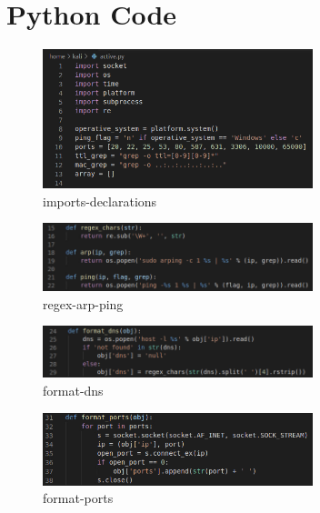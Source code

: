 \section{Python Code}
\label{s:lab2-python-code}

\begin{figure}[H]
  \centering
  \includegraphics[width=0.7\textwidth]{figures/code/imports-declarations}
  \caption{imports-declarations}
  \label{f:imports-declarations}
\end{figure}

\begin{figure}[H]
  \centering
  \includegraphics[width=0.7\textwidth]{figures/code/regex-arp-ping}
  \caption{regex-arp-ping}
  \label{f:regex-arp-ping}
\end{figure}

\begin{figure}[H]
  \centering
  \includegraphics[width=0.7\textwidth]{figures/code/format-dns}
  \caption{format-dns}
  \label{f:format-dns}
\end{figure}

\begin{figure}[H]
  \centering
  \includegraphics[width=0.7\textwidth]{figures/code/format-ports}
  \caption{format-ports}
  \label{f:format-ports}
\end{figure}

